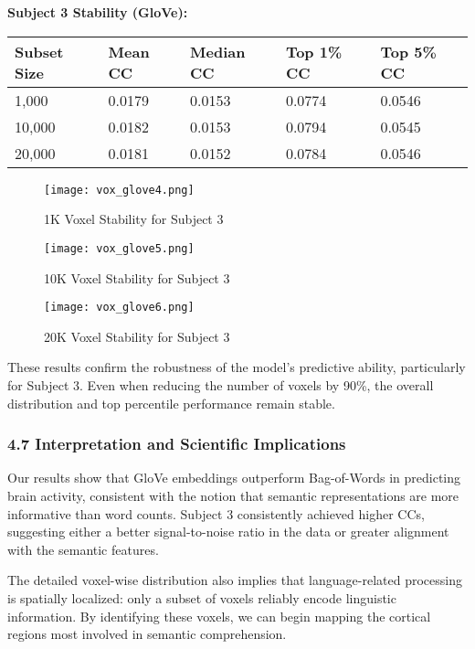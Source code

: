 \documentclass[11pt]{article}
\begin{document}
\textbf{Subject 3 Stability (GloVe):}

\begin{longtable}[]{@{}lllll@{}}
\toprule
Subset Size & Mean CC & Median CC & Top 1\% CC & Top 5\% CC \\
\midrule
\endhead
1,000 & 0.0179 & 0.0153 & 0.0774 & 0.0546 \\
10,000 & 0.0182 & 0.0153 & 0.0794 & 0.0545 \\
20,000 & 0.0181 & 0.0152 & 0.0784 & 0.0546 \\
\bottomrule
\end{longtable}

\begin{figure}
\centering
\texttt{[image: vox\_glove4.png]}
\caption{1K Voxel Stability for Subject 3}
\end{figure}

\begin{figure}
\centering
\texttt{[image: vox\_glove5.png]}
\caption{10K Voxel Stability for Subject 3}
\end{figure}

\begin{figure}
\centering
\texttt{[image: vox\_glove6.png]}
\caption{20K Voxel Stability for Subject 3}
\end{figure}

These results confirm the robustness of the model's predictive ability,
particularly for Subject 3. Even when reducing the number of voxels by
90\%, the overall distribution and top percentile performance remain
stable.

\hypertarget{interpretation-and-scientific-implications}{%
\subsubsection{4.7 Interpretation and Scientific
Implications}\label{interpretation-and-scientific-implications}}

Our results show that GloVe embeddings outperform Bag-of-Words in
predicting brain activity, consistent with the notion that semantic
representations are more informative than word counts. Subject 3
consistently achieved higher CCs, suggesting either a better
signal-to-noise ratio in the data or greater alignment with the semantic
features.

The detailed voxel-wise distribution also implies that language-related
processing is spatially localized: only a subset of voxels reliably
encode linguistic information. By identifying these voxels, we can begin
mapping the cortical regions most involved in semantic comprehension.
\end{document}
